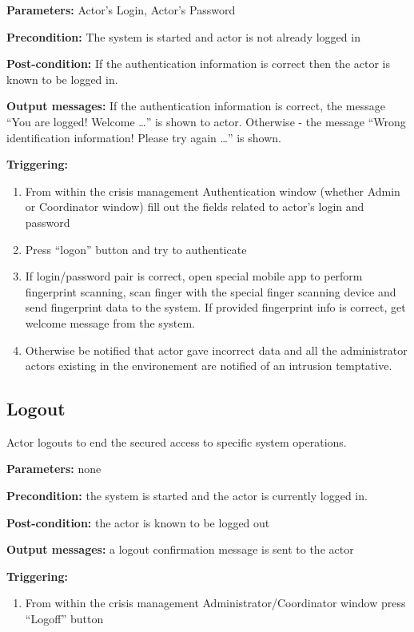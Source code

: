 \begin{description}

\item \textbf{Parameters:} Actor's Login, Actor's Password
\item \textbf{Precondition:} The system is started and actor is not already
logged in
\item \textbf{Post-condition:} If the authentication information is correct then
the actor is known to be logged in.
\item \textbf{Output messages:} If the authentication information is correct,
the message ``You are logged! Welcome \ldots'' is shown to actor. Otherwise -
the message ``Wrong identification information! Please try again \ldots'' is
shown.

\item \textbf{Triggering:}
\begin{enumerate}
\item From within the crisis management Authentication window (whether Admin or
Coordinator window) fill out the fields related to actor's login and password
\item Press ``logon'' button and try to authenticate
\item If login/password pair is correct, open special mobile app to perform
fingerprint scanning, scan finger with the special finger scanning device and
send fingerprint data to the system. If provided fingerprint info is correct,
get welcome message from the system.
\item Otherwise be notified that actor gave incorrect data and all
the administrator actors existing in the environement are notified of an
intrusion temptative.
\end{enumerate}

\end{description}

\subsection{Logout}
Actor logouts to end the secured access to specific system operations.

\begin{description}

\item \textbf{Parameters:} none
\item \textbf{Precondition:} the system is started and the actor is currently
logged in.
\item \textbf{Post-condition:} the actor is known to be logged out
\item \textbf{Output messages:} a logout confirmation message is sent to the
actor

\item \textbf{Triggering:}
\begin{enumerate}
\item From within the crisis management Administrator/Coordinator window press
``Logoff'' button
\end{enumerate}

\end{description}

